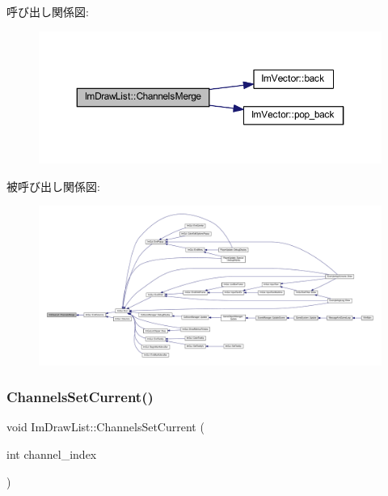 呼び出し関係図\+:\nopagebreak
\begin{figure}[H]
\begin{center}
\leavevmode
\includegraphics[width=350pt]{struct_im_draw_list_a2ed82c3f663cda520c90c55b94196274_cgraph}
\end{center}
\end{figure}
被呼び出し関係図\+:
\nopagebreak
\begin{figure}[H]
\begin{center}
\leavevmode
\includegraphics[width=350pt]{struct_im_draw_list_a2ed82c3f663cda520c90c55b94196274_icgraph}
\end{center}
\end{figure}
\mbox{\label{struct_im_draw_list_a7de44b9fdfce65f32063ecad9306a191}} 
\subsubsection{\texorpdfstring{Channels\+Set\+Current()}{ChannelsSetCurrent()}}
{\footnotesize\ttfamily void Im\+Draw\+List\+::\+Channels\+Set\+Current (\begin{DoxyParamCaption}\item[{int}]{channel\+\_\+index }\end{DoxyParamCaption})}



